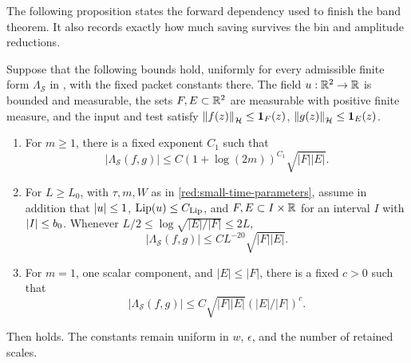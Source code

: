 The following proposition states the forward dependency used to
finish the band theorem. It also records exactly how much saving
survives the bin and amplitude reductions.

\begin{proposition}\label{red:model-suffices}
Suppose that the following bounds hold, uniformly for every admissible
finite form \(\Lambda_{\mathcal S}\) in
, with the fixed packet constants there.
The field \(u:\mathbb R^2\to\mathbb R\) is bounded and measurable, the sets
\(F,E\subset\mathbb R^2\) are measurable with positive finite measure,
and the input and test satisfy
\(\left\|f(z)\right\|_{\mathcal H}\le\mathbf 1_F(z)\),
\(\left\|g(z)\right\|_{\mathcal H}\le\mathbf 1_E(z)\).
\begin{enumerate}[label=\textup{(\roman*)}]
\item For \(m\ge1\), there is a fixed exponent \(C_1\) such that
\begin{equation}\label{red:model-basic}
 |\Lambda_{\mathcal S}(f,g)|
     \le C(1+\log(2m))^{C_1}\sqrt{|F||E|}.
\end{equation}
\item For \(L\ge L_0\), with \(\tau,m,W\) as in
\eqref{red:small-time-parameters}, assume in addition that
\(\left|u\right|\le1\), \(\operatorname{Lip}(u)\le C_{\rm Lip}\), and
\(F,E\subset I\times\mathbb R\) for an interval \(I\) with
\(\left|I\right|\le b_0\). Whenever
\(L/2\le\log\sqrt{|E|/|F|}\le2L\),
\begin{equation}\label{red:model-improved}
 |\Lambda_{\mathcal S}(f,g)|
       \le C L^{-20}\sqrt{|F||E|}.
\end{equation}
\item For \(m=1\), one scalar component, and \(|E|\le|F|\),
there is a fixed \(c>0\) such that
\begin{equation}\label{red:model-reverse}
 |\Lambda_{\mathcal S}(f,g)|
       \le C\sqrt{|F||E|}(|E|/|F|)^c.
\end{equation}
\end{enumerate}
Then  holds. The constants remain uniform
in \(w\), \(\epsilon\), and the number of retained scales.
\end{proposition}

